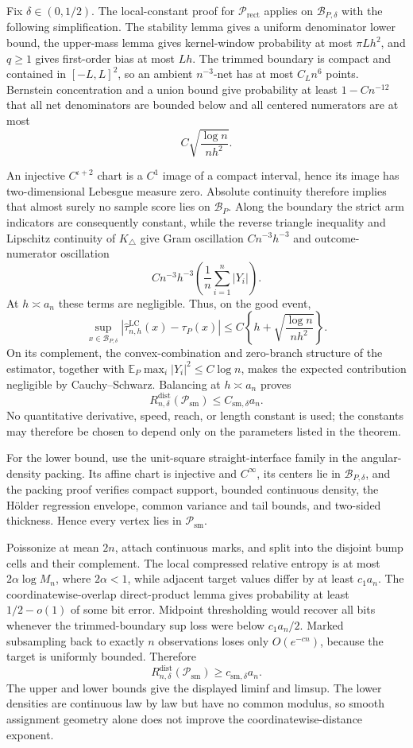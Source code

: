 Fix \(\delta\in(0,1/2)\).  The local-constant proof for \(\mathcal P_{\mathrm{rect}}\) applies on \(\mathcal B_{P,\delta}\) with the following simplification.  The stability lemma gives a uniform denominator lower bound, the upper-mass lemma gives kernel-window probability at most \(\pi Lh^2\), and \(q\geq1\) gives first-order bias at most \(Lh\).  The trimmed boundary is compact and contained in \([-L,L]^2\), so an ambient \(n^{-3}\)-net has at most \(C_Ln^6\) points.  Bernstein concentration and a union bound give probability at least \(1-Cn^{-12}\) that all net denominators are bounded below and all centered numerators are at most
\[
 C\sqrt{\frac{\log n}{nh^2}}.
\]

An injective \(C^{\iota+2}\) chart is a \(C^1\) image of a compact interval, hence its image has two-dimensional Lebesgue measure zero.  Absolute continuity therefore implies that almost surely no sample score lies on \(\mathcal B_P\).  Along the boundary the strict arm indicators are consequently constant, while the reverse triangle inequality and Lipschitz continuity of \(K_\triangle\) give Gram oscillation \(C n^{-3}h^{-3}\) and outcome-numerator oscillation
\[
 Cn^{-3}h^{-3}\left(\frac1n\sum_{i=1}^n|Y_i|\right).
\]
At \(h\asymp a_n\) these terms are negligible.  Thus, on the good event,
\[
 \sup_{x\in\mathcal B_{P,\delta}}
 |\widehat\tau^{\mathrm{LC}}_{n,h}(x)-\tau_P(x)|
 \leq C\left\{h+\sqrt{\frac{\log n}{nh^2}}\right\}.
\]
On its complement, the convex-combination and zero-branch structure of the estimator, together with \(\mathbb E_P\max_i|Y_i|^2\leq C\log n\), makes the expected contribution negligible by Cauchy--Schwarz.  Balancing at \(h\asymp a_n\) proves
\[
 R_{n,\delta}^{\mathrm{dist}}(\mathcal P_{\mathrm{sm}})\leq C_{\mathrm{sm},\delta}a_n.
\]
No quantitative derivative, speed, reach, or length constant is used; the constants may therefore be chosen to depend only on the parameters listed in the theorem.

For the lower bound, use the unit-square straight-interface family in the angular-density packing.  Its affine chart is injective and \(C^\infty\), its centers lie in \(\mathcal B_{P,\delta}\), and the packing proof verifies compact support, bounded continuous density, the H\"older regression envelope, common variance and tail bounds, and two-sided thickness.  Hence every vertex lies in \(\mathcal P_{\mathrm{sm}}\).

Poissonize at mean \(2n\), attach continuous marks, and split into the disjoint bump cells and their complement.  The local compressed relative entropy is at most \(2\alpha\log M_n\), where \(2\alpha<1\), while adjacent target values differ by at least \(c_1a_n\).  The coordinatewise-overlap direct-product lemma gives probability at least \(1/2-o(1)\) of some bit error.  Midpoint thresholding would recover all bits whenever the trimmed-boundary sup loss were below \(c_1a_n/2\).  Marked subsampling back to exactly \(n\) observations loses only \(O(e^{-cn})\), because the target is uniformly bounded.  Therefore
\[
 R_{n,\delta}^{\mathrm{dist}}(\mathcal P_{\mathrm{sm}})\geq c_{\mathrm{sm},\delta}a_n.
\]
The upper and lower bounds give the displayed liminf and limsup.  The lower densities are continuous law by law but have no common modulus, so smooth assignment geometry alone does not improve the coordinatewise-distance exponent.